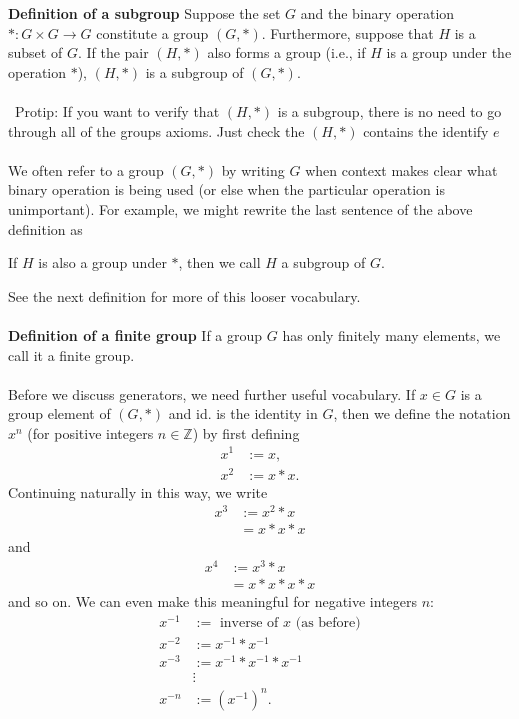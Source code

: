 \documentclass[12 pt]{article}
\newcommand{\Z}{\mathbb{Z}}
\numberwithin{equation}{section}
\begin{document}
\textbf{Definition of a subgroup} Suppose the set $G$ and the binary operation $*: G \times G \rightarrow G$ constitute a group $(G, *)$. Furthermore, suppose that $H$ is a subset of $G$. If the pair $(H,*)$ also forms a group (i.e., if $H$ is a group under the operation $*$), $(H,*)$ is a subgroup of $(G,*)$.\\
\\
\
Protip: If you want to verify that $(H,*)$ is a subgroup, there is no need to go through all of the groups axioms. Just check the $(H,*)$ contains the identify $e$
\\
\\
We often refer to a group $(G,*)$ by writing $G$ when context makes clear what binary operation is being used (or else when the particular operation is unimportant). For example, we might rewrite the last sentence of the above definition as \begin{center}
If $H$ is also a group under $*$, then we call $H$ a subgroup of $G$.
\end{center}
See the next definition for more of this looser vocabulary.\
\\
\\
\textbf{Definition of a finite group} If a group $G$ has only finitely many elements, we call it a finite group.
\
\\
\\
Before we discuss generators, we need further useful vocabulary. If $x \in G$ is a group element of $(G, *)$ and id. is the identity in $G$, then we define the notation $x^n$ (for positive integers $n \in \Z$) by first defining
\begin{align*}
x^1 & := x, \\
x^2 & := x * x. 
\end{align*}
Continuing naturally in this way, we write \begin{align*}
x^3 & := x^2 * x \\
\ & = x * x * x
\end{align*}
and
\begin{align*}
x^4 & := x^3 * x \\
\ & = x * x * x * x
\end{align*}
and so on. We can even make this meaningful for negative integers $n$:
\begin{align*}
x^{-1} & := \mbox{ inverse of }x \mbox{ (as before)} \\
x^{-2} & := x^{-1} * x^{-1} \\
x^{-3} & := x^{-1} * x^{-1} * x^{-1} \\
\ & \vdots \\
x^{-n} & := \left( x^{-1} \right)^n .
\end{align*}
\end{document}
